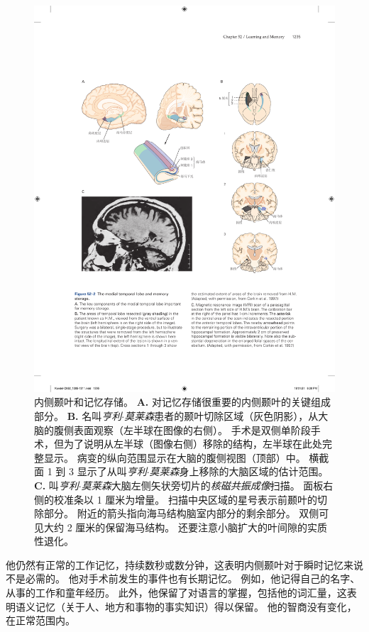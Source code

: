 \begin{figure}[htbp]
	\centering
	\includegraphics[width=1.0\linewidth]{chap52/fig_52_2}
	\caption{内侧颞叶和记忆存储。
		\textbf{A.} 对记忆存储很重要的内侧颞叶的关键组成部分。
		\textbf{B.} 名叫\textit{亨利$\cdot$莫莱森}患者的颞叶切除区域（灰色阴影），从大脑的腹侧表面观察（左半球在图像的右侧）。
		手术是双侧单阶段手术，但为了说明从左半球（图像右侧）移除的结构，左半球在此处完整显示。
		病变的纵向范围显示在大脑的腹侧视图（顶部）中。
		横截面 1 到 3 显示了从叫\textit{亨利$\cdot$莫莱森}身上移除的大脑区域的估计范围\cite{corkin1997hm}。
		\textbf{C.} 叫\textit{亨利$\cdot$莫莱森}大脑左侧矢状旁切片的\textit{核磁共振成像}扫描。
		面板右侧的校准条以 1 厘米为增量。
		扫描中央区域的星号表示前颞叶的切除部分。
		附近的箭头指向海马结构脑室内部分的剩余部分。
		双侧可见大约 2 厘米的保留海马结构。
		还要注意小脑扩大的叶间隙的实质性退化\cite{corkin1997hm}。}
	\label{fig:52_2}
\end{figure}


他仍然有正常的工作记忆，持续数秒或数分钟，这表明内侧颞叶对于瞬时记忆来说不是必需的。
他对手术前发生的事件也有长期记忆。
例如，他记得自己的名字、从事的工作和童年经历。
此外，他保留了对语言的掌握，包括他的词汇量，这表明语义记忆（关于人、地方和事物的事实知识）得以保留。
他的智商没有变化，在正常范围内。


